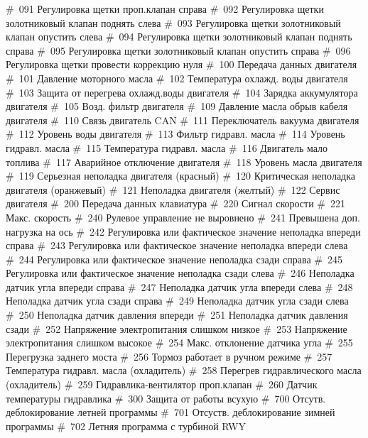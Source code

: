  {\#\ 091 Регулировка щетки проп.клапан справа}
 {\#\ 092 Регулировка щетки золотниковый клапан поднять слева}
 {\#\ 093 Регулировка щетки золотниковый клапан опустить слева}
 {\#\ 094 Регулировка щетки золотниковый клапан поднять справа}
 {\#\ 095 Регулировка щетки золотниковый клапан опустить справа}
 {\#\ 096 Регулировка щетки провести коррекцию нуля}
 {\#\ 100 Передача данных двигателя}
 {\#\ 101 Давление моторного масла}
 {\#\ 102 Температура охлажд. воды двигателя}
 {\#\ 103 Защита от перегрева охлажд.воды двигателя}
 {\#\ 104 Зарядка аккумулятора двигателя}
 {\#\ 105 Возд. фильтр двигателя}
 {\#\ 109 Давление масла обрыв кабеля двигателя}
 {\#\ 110 Связь двигатель CAN}
 {\#\ 111 Переключатель вакуума двигателя}
 {\#\ 112 Уровень воды двигателя}
 {\#\ 113 Фильтр гидравл. масла}
 {\#\ 114 Уровень гидравл. масла}
 {\#\ 115 Температура гидравл. масла}
 {\#\ 116 Двигатель мало топлива}
 {\#\ 117 Аварийное отключение двигателя}
 {\#\ 118 Уровень масла двигателя}
 {\#\ 119 Серьезная неполадка двигателя (красный)}
 {\#\ 120 Критическая неполадка двигателя (оранжевый)}
 {\#\ 121 Неполадка двигателя (желтый)}
 {\#\ 122 Сервис двигателя}
 {\#\ 200 Передача данных клавиатура}
 {\#\ 220 Сигнал скорости}
 {\#\ 221 Макс. скорость}
 {\#\ 240 Рулевое управление не выровнено}
 {\#\ 241 Превышена доп. нагрузка на ось}
 {\#\ 242 Регулировка или фактическое значение неполадка впереди справа}
 {\#\ 243 Регулировка или фактическое значение неполадка впереди слева}
 {\#\ 244 Регулировка или фактическое значение неполадка сзади справа}
 {\#\ 245 Регулировка или фактическое значение неполадка сзади слева}
 {\#\ 246 Неполадка датчик угла впереди справа}
 {\#\ 247 Неполадка датчик угла впереди слева}
 {\#\ 248 Неполадка датчик угла сзади справа}
 {\#\ 249 Неполадка датчик угла сзади слева}
 {\#\ 250 Неполадка датчик давления впереди}
 {\#\ 251 Неполадка датчик давления сзади}
 {\#\ 252 Напряжение электропитания слишком низкое}
 {\#\ 253 Напряжение электропитания слишком высокое}
 {\#\ 254 Макс. отклонение датчика угла}
 {\#\ 255 Перегрузка заднего моста}
 {\#\ 256 Тормоз работает в ручном режиме}
 {\#\ 257 Температура гидравл. масла (охладитель)}
 {\#\ 258 Перегрев гидравлического масла (охладитель)}
 {\#\ 259 Гидравлика-вентилятор проп.клапан}
 {\#\ 260 Датчик температуры гидравлика}
 {\#\ 300 Защита от работы всухую}
 {\#\ 700 Отсутв. деблокирование летней программы}
 {\#\ 701 Отсуств. деблокирование зимней программы}
 {\#\ 702 Летняя программа с турбиной RWY}
\stopsetups


